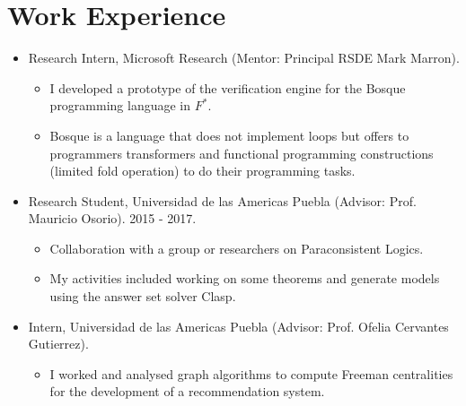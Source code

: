 \section{Work Experience}

\begin{itemize}

  \item Research Intern, Microsoft Research (Mentor: Principal RSDE Mark Marron).
    \begin{itemize}
      \item I developed a prototype of the verification engine for the Bosque programming language in $F^{*}$. 
      \item Bosque is a language that does not implement loops but offers to programmers transformers
        and functional programming constructions (limited fold operation) to do their programming tasks.
    \end{itemize}


  \item Research Student, Universidad de las Americas Puebla (Advisor: Prof. Mauricio
    Osorio). 2015 - 2017. 
    \begin{itemize}
      \item Collaboration with a group or researchers on Paraconsistent
        Logics. 
      \item My activities included working on some theorems and generate models using
        the answer set solver Clasp.
    \end{itemize}

  \item Intern, Universidad de las Americas Puebla (Advisor: Prof. Ofelia
    Cervantes Gutierrez). 
    \begin{itemize}
      \item I worked and analysed graph algorithms to
        compute Freeman centralities for the development of a recommendation
        system.
    \end{itemize}
\end{itemize}
